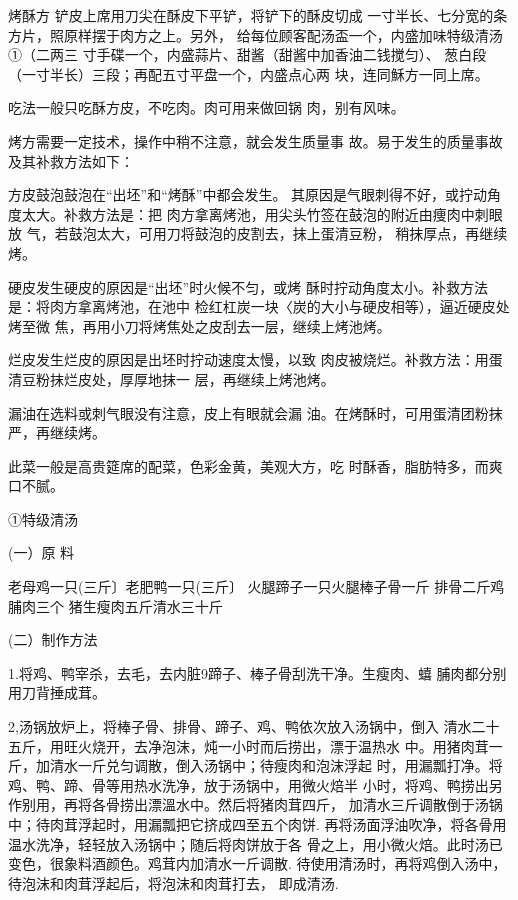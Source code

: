 \begin{recipe}{烤酥方}
\step 铲皮上席用刀尖在酥皮下平铲，将铲下的酥皮切成
一寸半长、七分宽的条方片，照原样摆于肉方之上。另外，
给每位顾客配汤盃一个，内盛加味特级清汤①（二两三
寸手碟一个，内盛蒜片、甜酱（甜酱中加香油二钱搅匀）、
葱白段（一寸半长）三段；再配五寸平盘一个，内盛点心两 块，连同穌方一同上席。

\step 吃法一般只吃酥方皮，不吃肉。肉可用来做回锅 肉，别有风味。

\notice

烤方需要一定技术，操作中稍不注意，就会发生质量事
故。易于发生的质量事故及其补救方法如下：

\step 方皮鼓泡鼓泡在“出坯”和“烤酥”中都会发生。
其原因是气眼刺得不好，或拧动角度太大。补救方法是：把
肉方拿离烤池，用尖头竹签在鼓泡的附近由痩肉中刺眼放
气，若鼓泡太大，可用刀将鼓泡的皮割去，抹上蛋清豆粉， 稍抹厚点，再继续烤。

\step 硬皮发生硬皮的原因是“出坯”时火候不匀，或烤
酥时拧动角度太小。补救方法是：将肉方拿离烤池，在池中
检红杠炭一块〈炭的大小与硬皮相等），逼近硬皮处烤至微
焦，再用小刀将烤焦处之皮刮去一层，继续上烤池烤。

\step 烂皮发生烂皮的原因是出坯时拧动速度太慢，以致
肉皮被烧烂。补救方法：用蛋清豆粉抹烂皮处，厚厚地抹一 层，再继续上烤池烤。

\step 漏油在选料或刺气眼没有注意，皮上有眼就会漏
油。在烤酥时，可用蛋清团粉抹严，再继续烤。

\notes

此菜一般是高贵筵席的配菜，色彩金黄，美观大方，吃
时酥香，脂肪特多，而爽口不腻。

①特级清汤

(一）原 料

老母鸡一只(三斤〕老肥鸭一只(三斤〕
火腿蹄子一只火腿棒子骨一斤
排骨二斤鸡脯肉三个
猪生瘦肉五斤清水三十斤

(二）制作方法

1.将鸡、鸭宰杀，去毛，去内脏9蹄子、棒子骨刮洗干净。生瘦肉、蟢 脯肉都分别用刀背捶成茸。

2,汤锅放炉上，将棒子骨、排骨、蹄子、鸡、鸭依次放入汤锅中，倒入 清水二十五斤，用旺火烧开，去净泡沫，炖一小时而后捞出，漂于温热水 中。用猪肉茸一斤，加清水一斤兑匀调散，倒入汤锅中；待瘦肉和泡沫浮起 时，用漏瓢打净。将鸡、鸭、蹄、骨等用热水洗净，放于汤锅中，用微火焙半 小时，将鸡、鸭捞出另作别用，再将各骨捞出漂溫水中。然后将猪肉茸四斤， 加清水三斤调散倒于汤锅中；待肉茸浮起时，用漏瓢把它挤成四至五个肉饼. 再将汤面浮油吹净，将各骨用温水洗净，轻轻放入汤锅中；随后将肉饼放于各 骨之上，用小微火焙。此时汤已变色，很象料酒颜色。鸡茸内加清水一斤调散. 待使用清汤时，再将鸡倒入汤中，待泡沫和肉茸浮起后，将泡沫和肉茸打去， 即成清汤.

\end{recipe}

